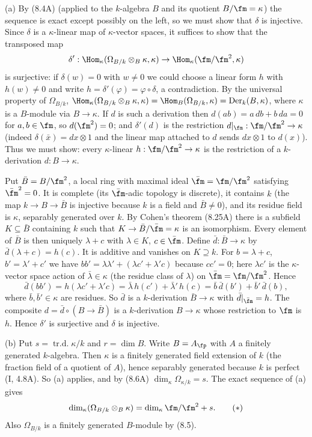 \documentclass[11pt]{article}
\begin{document}
(a) By (8.4A) (applied to the $k$-algebra $B$ and its quotient $B/\fm=\kappa$) the sequence is exact except possibly on the left, so we must show that $\delta$ is injective. Since $\delta$ is a $\kappa$-linear map of $\kappa$-vector spaces, it suffices to show that the transposed map
\[\delta':\Hom_\kappa(\Omega_{B/k}\otimes_B\kappa,\kappa)\to \Hom_\kappa(\fm/\fm^2,\kappa)\]
is surjective: if $\delta(w)=0$ with $w\neq0$ we could choose a linear form $h$ with $h(w)\ne0$ and write $h=\delta'(\varphi)=\varphi\circ\delta$, a contradiction. By the universal property of $\Omega_{B/k}$, $\Hom_\kappa(\Omega_{B/k}\otimes_B\kappa,\kappa)=\Hom_B(\Omega_{B/k},\kappa)=\operatorname{Der}_k(B,\kappa)$, where $\kappa$ is a $B$-module via $B\to\kappa$. If $d$ is such a derivation then $d(ab)=a\,db+b\,da=0$ for $a,b\in\fm$, so $d(\fm^2)=0$; and $\delta'(d)$ is the restriction $d|_\fm:\fm/\fm^2\to\kappa$ (indeed $\delta(\bar x)=dx\otimes1$ and the linear map attached to $d$ sends $dx\otimes 1$ to $d(x)$). Thus we must show: every $\kappa$-linear $h:\fm/\fm^2\to\kappa$ is the restriction of a $k$-derivation $d:B\to\kappa$.

Put $\bar B=B/\fm^2$, a local ring with maximal ideal $\bar\fm=\fm/\fm^2$ satisfying $\bar\fm^2=0$. It is complete (its $\bar\fm$-adic topology is discrete), it contains $k$ (the map $k\to B\to\bar B$ is injective because $k$ is a field and $\bar B\ne0$), and its residue field is $\kappa$, separably generated over $k$. By Cohen's theorem (8.25A) there is a subfield $K\subseteq\bar B$ containing $k$ such that $K\to\bar B/\bar\fm=\kappa$ is an isomorphism. Every element of $\bar B$ is then uniquely $\lambda+c$ with $\lambda\in K$, $c\in\bar\fm$. Define $\bar d:\bar B\to\kappa$ by $\bar d(\lambda+c)=h(c)$. It is additive and vanishes on $K\supseteq k$. For $b=\lambda+c$, $b'=\lambda'+c'$ we have $bb'=\lambda\lambda'+(\lambda c'+\lambda' c)$ because $cc'=0$; here $\lambda c'$ is the $\kappa$-vector space action of $\bar\lambda\in\kappa$ (the residue class of $\lambda$) on $\bar\fm=\fm/\fm^2$. Hence
\[\bar d(bb')=h(\lambda c'+\lambda'c)=\bar\lambda\,h(c')+\bar\lambda'\,h(c)=\bar b\,\bar d(b')+\bar b'\,\bar d(b),\]
where $\bar b,\bar b'\in\kappa$ are residues. So $\bar d$ is a $k$-derivation $\bar B\to\kappa$ with $\bar d|_{\bar\fm}=h$. The composite $d=\bar d\circ(B\to\bar B)$ is a $k$-derivation $B\to\kappa$ whose restriction to $\fm$ is $h$. Hence $\delta'$ is surjective and $\delta$ is injective.

(b) Put $s=\operatorname{tr.d.}\kappa/k$ and $r=\dim B$. Write $B=A_{\fp}$ with $A$ a finitely generated $k$-algebra. Then $\kappa$ is a finitely generated field extension of $k$ (the fraction field of a quotient of $A$), hence separably generated because $k$ is perfect (I, 4.8A). So (a) applies, and by (8.6A) $\dim_\kappa\Omega_{\kappa/k}=s$. The exact sequence of (a) gives
\[\dim_\kappa(\Omega_{B/k}\otimes_B\kappa)=\dim_\kappa\fm/\fm^2+s.\tag{$*$}\]
Also $\Omega_{B/k}$ is a finitely generated $B$-module by (8.5).
\end{document}
